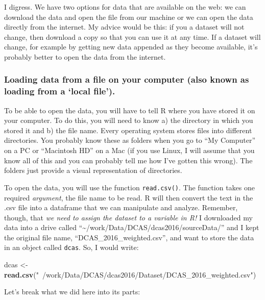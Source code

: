 \documentclass[]{article}
\newenvironment{Shaded}{\begin{snugshade}}{\end{snugshade}}
\newcommand{\KeywordTok}[1]{\textcolor[rgb]{0.13,0.29,0.53}{\textbf{{#1}}}}
\newcommand{\StringTok}[1]{\textcolor[rgb]{0.31,0.60,0.02}{{#1}}}
\newcommand{\NormalTok}[1]{{#1}}
\begin{document}
I digress. We have two options for data that are available on the web:
we can download the data and open the file from our machine or we can
open the data directly from the internet. My advice would be this: if
you a dataset will not change, then download a copy so that you can use
it at any time. If a dataset will change, for example by getting new
data appended as they become available, it's probably better to open the
data from the internet.

\hypertarget{data_local}{\subsubsection{\texorpdfstring{Loading data
from a file on your computer (also known as loading from a `local
file').}{Loading data from a file on your computer (also known as loading from a local file).}}\label{data_local}}

To be able to open the data, you will have to tell R where you have
stored it on your computer. To do this, you will need to know a) the
directory in which you stored it and b) the file name. Every operating
system stores files into different directories. You probably know these
as folders when you go to ``My Computer'' on a PC or ``Macintosh HD'' on
a Mac (if you use Linux, I will assume that you know all of this and you
can probably tell me how I've gotten this wrong). The folders just
provide a visual representation of directories.

To open the data, you will use the function \texttt{read.csv()}. The
function takes one required \emph{argument}, the file name to be read. R
will then convert the text in the .csv file into a dataframe that we can
manipulate and analyze. Remember, though, that \emph{we need to assign
the dataset to a variable in R!} I downloaded my data into a drive
called ``\textasciitilde{}/work/Data/DCAS/dcas2016/sourceData/'' and I
kept the original file name, ``DCAS\_2016\_weighted.csv'', and want to
store the data in an object called \texttt{dcas}. So, I would write:

\begin{Shaded}
\begin{Highlighting}[]
\NormalTok{dcas <-}\StringTok{ }\KeywordTok{read.csv}\NormalTok{(}\StringTok{"~/work/Data/DCAS/dcas2016/Dataset/DCAS_2016_weighted.csv"}\NormalTok{)}
\end{Highlighting}
\end{Shaded}

Let's break what we did here into its parts:
\end{document}
